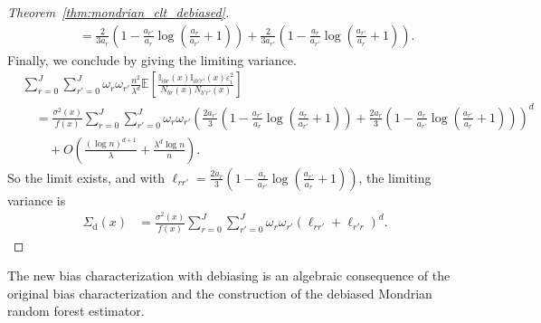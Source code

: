 \documentclass[11pt,lof]{puthesis}
\newcommand{\E}{\ensuremath{\mathbb{E}}}
\newcommand{\I}{\ensuremath{\mathbb{I}}}
\newcommand{\rd}{\ensuremath{\mathrm{d}}}
\theoremstyle{break}
\theoremstyle{proof}
\newtheorem{proof}{Proof}
\begin{document}
\begin{proof}[Theorem~\ref{thm:mondrian_clt_debiased}]
\begin{align*}
    &\quad=
    \frac{2}{3 a_r}
    \left(
      1 - \frac{a_{r'}}{a_r}
      \log\left(\frac{a_{r}}{a_{r'}} + 1\right)
    \right)
    + \frac{2}{3 a_{r'}}
    \left(
      1 - \frac{a_r }{a_{r'}}
      \log\left(\frac{a_{r'}}{a_{r}} + 1\right)
    \right).
  \end{align*}
  Finally, we conclude by giving the limiting variance.
  \begin{align*}
    &\sum_{r=0}^{J}
    \sum_{r'=0}^{J}
    \omega_r
    \omega_{r'}
    \frac{n^2}{\lambda^d}
    \E \left[
      \frac{\I_{i b r}(x) \I_{i b' r'}(x) \varepsilon_i^2}
      {N_{b r}(x) N_{b' r'}(x)}
    \right] \\
    &\quad=
    \frac{\sigma^2(x)}{f(x)}
    \sum_{r=0}^{J}
    \sum_{r'=0}^{J}
    \omega_r
    \omega_{r'}
    \left(
      \frac{2 a_{r'}}{3}
      \left(
        1 - \frac{a_{r'}}{a_r}
        \log\left(\frac{a_r}{a_{r'}} + 1\right)
      \right)
      + \frac{2 a_r}{3}
      \left(
        1 - \frac{a_r}{a_{r'}}
        \log\left(\frac{a_{r'}}{a_r} + 1\right)
      \right)
    \right)^d \\
    &\qquad+
    O \left(
      \frac{(\log n)^{d+1}}{\lambda}
      + \frac{\lambda^d \log n}{n}
    \right).
  \end{align*}
  So the limit exists, and
  with $\ell_{r r'} = \frac{2 a_r}{3} \left( 1 - \frac{a_{r}}{a_{r'}}
  \log\left(\frac{a_{r'}}{a_{r}} + 1\right) \right)$,
  the limiting variance is
  \begin{align*}
    \Sigma_\rd(x)
    &=
    \frac{\sigma^2(x)}{f(x)}
    \sum_{r=0}^{J} \sum_{r'=0}^{J} \omega_r \omega_{r'}
    \left( \ell_{r r'} + \ell_{r' r} \right)^d.
  \end{align*}
\end{proof}

The new bias characterization with debiasing is an algebraic
consequence of the original bias characterization and the construction
of the debiased Mondrian random forest estimator.
\end{document}
